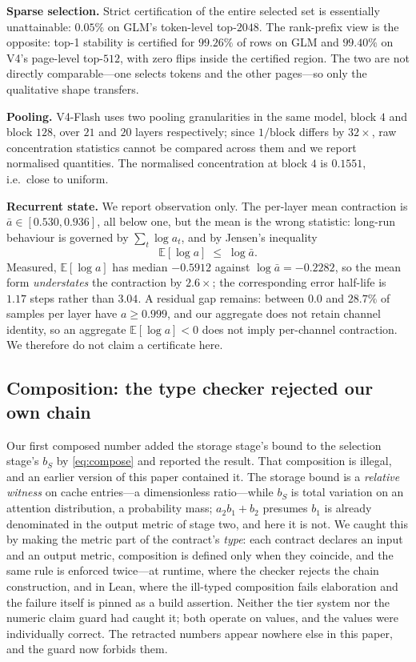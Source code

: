 \documentclass[11pt]{article}
\begin{document}
\textbf{Sparse selection.} Strict certification of the entire selected set is
essentially unattainable: $0.05\%$ on GLM's token-level top-$2048$. The rank-prefix
view is the opposite: top-1 stability is certified for $99.26\%$ of rows on GLM and
$99.40\%$ on V4's page-level top-$512$, with zero flips inside the certified region.
The two are not directly comparable---one selects tokens and the other pages---so
only the qualitative shape transfers.

\textbf{Pooling.} V4-Flash uses two pooling granularities in the same model,
block $4$ and block $128$, over $21$ and $20$ layers respectively; since
$1/\text{block}$ differs by $32\times$, raw concentration statistics cannot be
compared across them and we report normalised quantities. The normalised
concentration at block $4$ is $0.1551$, i.e.\ close to uniform.

\textbf{Recurrent state.} We report observation only. The per-layer mean contraction
is $\bar a\in[0.530,0.936]$, all below one, but the mean is the wrong statistic:
long-run behaviour is governed by $\sum_t\log a_t$, and by Jensen's inequality
\begin{equation}
\mathbb{E}[\log a] \;\le\; \log\bar a.
\label{eq:jensen}
\end{equation} Measured, $\mathbb{E}[\log a]$ has median
$-0.5912$ against $\log\bar a=-0.2282$, so the mean form \emph{understates} the
contraction by $2.6\times$; the corresponding error half-life is $1.17$ steps rather
than $3.04$. A residual gap remains: between $0.0$ and $28.7\%$ of samples per layer
have $a\ge0.999$, and our aggregate does not retain channel identity, so an aggregate
$\mathbb{E}[\log a]<0$ does not imply per-channel contraction. We therefore do not
claim a certificate here.

\subsection{Composition: the type checker rejected our own chain}
Our first composed number added the storage stage's bound to the selection stage's
$b_S$ by \eqref{eq:compose} and reported the result. That composition is illegal,
and an earlier version of this paper contained it. The storage bound is a
\emph{relative witness} on cache entries---a dimensionless ratio---while $b_S$ is
total variation on an attention distribution, a probability mass; $a_2 b_1 + b_2$
presumes $b_1$ is already denominated in the output metric of stage two, and here it
is not. We caught this by making the metric part of the contract's \emph{type}:
each contract declares an input and an output metric, composition is defined only
when they coincide, and the same rule is enforced twice---at runtime, where the
checker rejects the chain construction, and in Lean, where the ill-typed composition
fails elaboration and the failure itself is pinned as a build assertion. Neither the
tier system nor the numeric claim guard had caught it; both operate on values, and
the values were individually correct. The retracted numbers appear nowhere else in
this paper, and the guard now forbids them.
\end{document}
